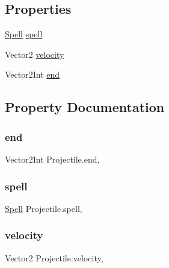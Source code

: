 \subsection*{Properties}
\begin{DoxyCompactItemize}
\item 
\mbox{\hyperlink{class_spell}{Spell}} \mbox{\hyperlink{class_projectile_adf481201408f58e0fe934bfe0e47229f}{spell}}
\item 
Vector2 \mbox{\hyperlink{class_projectile_a2d9755facfa238e047de85c626587cd2}{velocity}}
\item 
Vector2\+Int \mbox{\hyperlink{class_projectile_a488a27f52325780f1315b5c64949d9ca}{end}}
\end{DoxyCompactItemize}


\subsection{Property Documentation}
\mbox{\label{class_projectile_a488a27f52325780f1315b5c64949d9ca}} 
\subsubsection{\texorpdfstring{end}{end}}
{\footnotesize\ttfamily Vector2\+Int Projectile.\+end\hspace{0.3cm}{\ttfamily [get]}, {\ttfamily [set]}}

\mbox{\label{class_projectile_adf481201408f58e0fe934bfe0e47229f}} 
\subsubsection{\texorpdfstring{spell}{spell}}
{\footnotesize\ttfamily \mbox{\hyperlink{class_spell}{Spell}} Projectile.\+spell\hspace{0.3cm}{\ttfamily [get]}, {\ttfamily [set]}}

\mbox{\label{class_projectile_a2d9755facfa238e047de85c626587cd2}} 
\subsubsection{\texorpdfstring{velocity}{velocity}}
{\footnotesize\ttfamily Vector2 Projectile.\+velocity\hspace{0.3cm}{\ttfamily [get]}, {\ttfamily [set]}}


